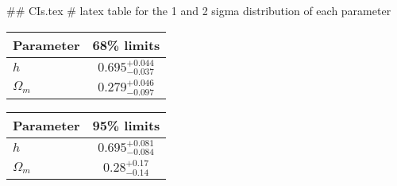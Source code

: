 ## CIs.tex
# latex table for the 1 and 2 sigma distribution of each parameter

\begin{tabular} { l  c}
 Parameter &  68\% limits\\
\hline
{\boldmath$h              $} & $0.695^{+0.044}_{-0.037}   $\\
{\boldmath$\Omega_m       $} & $0.279^{+0.046}_{-0.097}   $\\
\hline
\end{tabular}

\begin{tabular} { l  c}
 Parameter &  95\% limits\\
\hline
{\boldmath$h              $} & $0.695^{+0.081}_{-0.084}   $\\
{\boldmath$\Omega_m       $} & $0.28^{+0.17}_{-0.14}      $\\
\hline
\end{tabular}
